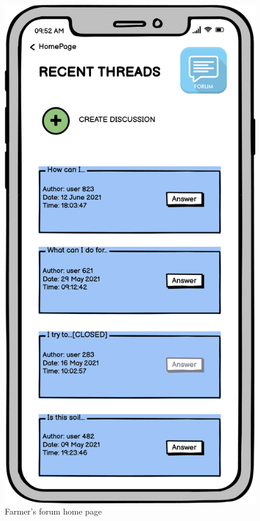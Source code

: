 \bigskip
\begin{figure}[H]
    \centering
    \includegraphics[scale=0.40]{Images/farmerForum.png}
    \caption{Farmer's forum home page}
\end{figure}

